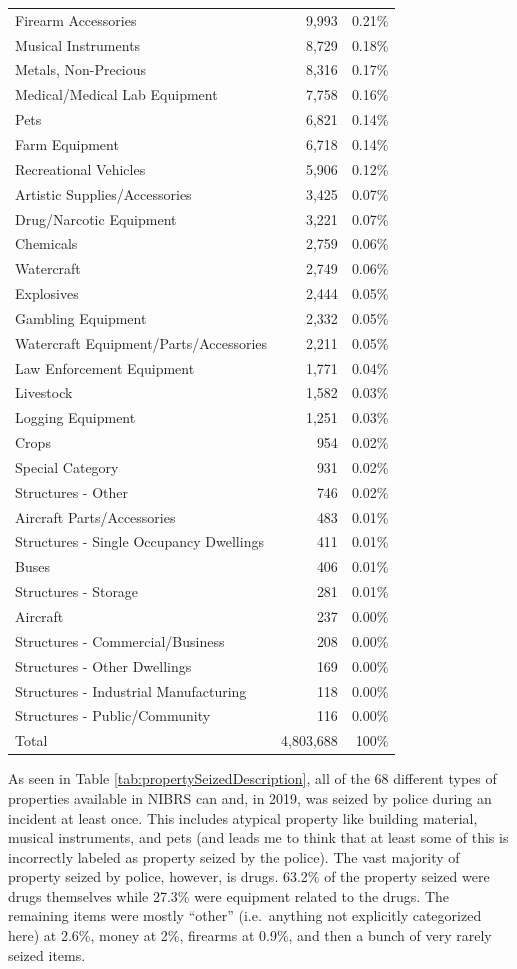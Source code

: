 \documentclass[
  12pt,
  openany]{book}
\begin{document}
\begin{longtable}[]{@{}lrr@{}}
Firearm Accessories & 9,993 & 0.21\%\tabularnewline
Musical Instruments & 8,729 & 0.18\%\tabularnewline
Metals, Non-Precious & 8,316 & 0.17\%\tabularnewline
Medical/Medical Lab Equipment & 7,758 & 0.16\%\tabularnewline
Pets & 6,821 & 0.14\%\tabularnewline
Farm Equipment & 6,718 & 0.14\%\tabularnewline
Recreational Vehicles & 5,906 & 0.12\%\tabularnewline
Artistic Supplies/Accessories & 3,425 & 0.07\%\tabularnewline
Drug/Narcotic Equipment & 3,221 & 0.07\%\tabularnewline
Chemicals & 2,759 & 0.06\%\tabularnewline
Watercraft & 2,749 & 0.06\%\tabularnewline
Explosives & 2,444 & 0.05\%\tabularnewline
Gambling Equipment & 2,332 & 0.05\%\tabularnewline
Watercraft Equipment/Parts/Accessories & 2,211 & 0.05\%\tabularnewline
Law Enforcement Equipment & 1,771 & 0.04\%\tabularnewline
Livestock & 1,582 & 0.03\%\tabularnewline
Logging Equipment & 1,251 & 0.03\%\tabularnewline
Crops & 954 & 0.02\%\tabularnewline
Special Category & 931 & 0.02\%\tabularnewline
Structures - Other & 746 & 0.02\%\tabularnewline
Aircraft Parts/Accessories & 483 & 0.01\%\tabularnewline
Structures - Single Occupancy Dwellings & 411 & 0.01\%\tabularnewline
Buses & 406 & 0.01\%\tabularnewline
Structures - Storage & 281 & 0.01\%\tabularnewline
Aircraft & 237 & 0.00\%\tabularnewline
Structures - Commercial/Business & 208 & 0.00\%\tabularnewline
Structures - Other Dwellings & 169 & 0.00\%\tabularnewline
Structures - Industrial Manufacturing & 118 & 0.00\%\tabularnewline
Structures - Public/Community & 116 & 0.00\%\tabularnewline
Total & 4,803,688 & 100\%\tabularnewline
\bottomrule
\end{longtable}

As seen in Table \ref{tab:propertySeizedDescription}, all of the 68 different types of properties available in NIBRS can and, in 2019, was seized by police during an incident at least once. This includes atypical property like building material, musical instruments, and pets (and leads me to think that at least some of this is incorrectly labeled as property seized by the police). The vast majority of property seized by police, however, is drugs. 63.2\% of the property seized were drugs themselves while 27.3\% were equipment related to the drugs. The remaining items were mostly ``other'' (i.e.~anything not explicitly categorized here) at 2.6\%, money at 2\%, firearms at 0.9\%, and then a bunch of very rarely seized items.
\end{document}
